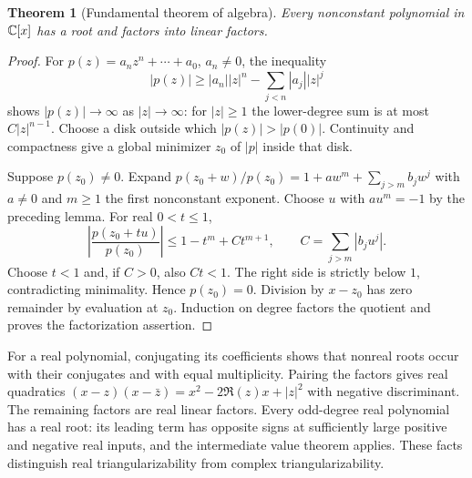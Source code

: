 \documentclass[11pt,a4paper]{book}
\newtheorem{theorem}{Theorem}[chapter]
\theoremstyle{definition}\newtheorem{definition}[theorem]{Definition}
\theoremstyle{remark}\newtheorem{remark}[theorem]{Remark}
\begin{document}
\begin{theorem}[Fundamental theorem of algebra]\label{aux:fta}
Every nonconstant polynomial in $\mathbb C[x]$ has a root and factors into linear factors.
\end{theorem}
\begin{proof}
For $p(z)=a_nz^n+\cdots+a_0$, $a_n\ne0$, the inequality
\[
 |p(z)|\ge |a_n||z|^n-\sum_{j<n}|a_j||z|^j
\]
shows $|p(z)|\to\infty$ as $|z|\to\infty$: for $|z|\ge1$ the lower-degree sum is at most $C|z|^{n-1}$. Choose a disk outside which $|p(z)|>|p(0)|$. Continuity and compactness give a global minimizer $z_0$ of $|p|$ inside that disk.

Suppose $p(z_0)\ne0$. Expand $p(z_0+w)/p(z_0)=1+aw^m+\sum_{j>m}b_jw^j$ with $a\ne0$ and $m\ge1$ the first nonconstant exponent. Choose $u$ with $au^m=-1$ by the preceding lemma. For real $0<t\le1$,
\[
 \left|\frac{p(z_0+tu)}{p(z_0)}\right|
 \le 1-t^m+Ct^{m+1},\qquad C=\sum_{j>m}|b_ju^j|.
\]
Choose $t<1$ and, if $C>0$, also $Ct<1$. The right side is strictly below $1$, contradicting minimality. Hence $p(z_0)=0$. Division by $x-z_0$ has zero remainder by evaluation at $z_0$. Induction on degree factors the quotient and proves the factorization assertion.
\end{proof}

For a real polynomial, conjugating its coefficients shows that nonreal roots occur with their conjugates and with equal multiplicity. Pairing the factors gives real quadratics $(x-z)(x-\bar z)=x^2-2\Re(z)x+|z|^2$ with negative discriminant. The remaining factors are real linear factors. Every odd-degree real polynomial has a real root: its leading term has opposite signs at sufficiently large positive and negative real inputs, and the intermediate value theorem applies. These facts distinguish real triangularizability from complex triangularizability.
\end{document}
